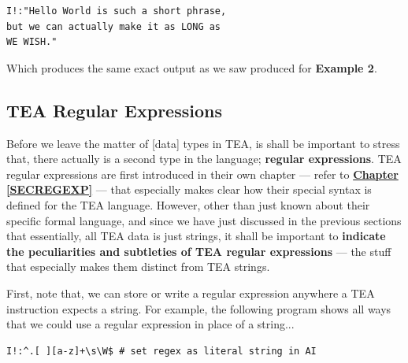 \documentclass[a4paper, 18pt]{book} %
\begin{document}
{{{\begin{appendices}
\vspace{2em}

  \begin{tcolorbox}[teaterminalstyle, title=TEA MULTI-STRINGS: Example 4: Dealing with Long Strings with Line Breaks, breakable]
  \begin{lstlisting}[language=TEA,breaklines=true,]
I!:"Hello World is such a short phrase,
but we can actually make it as LONG as
WE WISH."
   \end{lstlisting}
  \end{tcolorbox}

\vspace{2em}

Which produces the same exact output as we saw produced for \textbf{Example 2}.


\subsection{TEA Regular Expressions}


Before we leave the matter of [data] types in TEA, is shall be important to stress that, there actually is a second type in the language; \textbf{regular expressions}. TEA regular expressions are first introduced in their own chapter --- refer to \textbf{\hyperref[SECREGEXP]{Chapter \ref{SECREGEXP}}} --- that especially makes clear how their special syntax is defined for the TEA language. However, other than just known about their specific formal language, and since we have just discussed in the previous sections that essentially, all TEA data is just strings, it shall be important to \textbf{indicate the peculiarities and subtleties of TEA regular expressions} --- the stuff that especially makes them distinct from TEA strings.

\vspace{2em}

First, note that, we can store or write a regular expression anywhere a TEA instruction expects a string. For example, the following program shows all ways that we could use a regular expression in place of a string...

\vspace{2em}

  \begin{tcolorbox}[teaterminalstyle, title=TEA Regular Expressions: Example 1: Handling Literal Regexs in Place of TEA Strings, breakable]
  \begin{lstlisting}[language=TEA,breaklines=true,]
I!:^.[ ][a-z]+\s\W$ # set regex as literal string in AI


\end{lstlisting}
\end{tcolorbox}
\end{appendices}}}}
\end{document}
